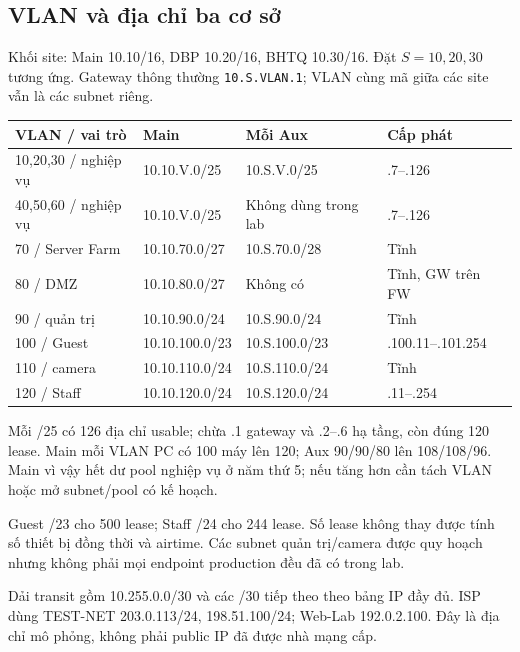 \documentclass[
  11pt,
]{article}
\begin{document}
\subsection{VLAN và địa chỉ ba cơ sở}
Khối site: Main 10.10/16, DBP 10.20/16, BHTQ 10.30/16. Đặt $S=10,20,30$ tương ứng. Gateway thông thường \texttt{10.S.VLAN.1}; VLAN cùng mã giữa các site vẫn là các subnet riêng.
\par\noindent
{}
\begin{tabularx}{\linewidth}{@{}lXXX@{}}\toprule
VLAN / vai trò & Main & Mỗi Aux & Cấp phát\\\midrule
10,20,30 / nghiệp vụ & 10.10.V.0/25 & 10.S.V.0/25 & .7--.126\\
40,50,60 / nghiệp vụ & 10.10.V.0/25 & Không dùng trong lab & .7--.126\\
70 / Server Farm & 10.10.70.0/27 & 10.S.70.0/28 & Tĩnh\\
80 / DMZ & 10.10.80.0/27 & Không có & Tĩnh, GW trên FW\\
90 / quản trị & 10.10.90.0/24 & 10.S.90.0/24 & Tĩnh\\
100 / Guest & 10.10.100.0/23 & 10.S.100.0/23 & .100.11--.101.254\\
110 / camera & 10.10.110.0/24 & 10.S.110.0/24 & Tĩnh\\
120 / Staff & 10.10.120.0/24 & 10.S.120.0/24 & .11--.254\\\bottomrule\end{tabularx}\par

Mỗi /25 có 126 địa chỉ usable; chừa .1 gateway và .2--.6 hạ tầng, còn đúng 120 lease. Main mỗi VLAN PC có 100 máy lên 120; Aux 90/90/80 lên 108/108/96. Main vì vậy hết dư pool nghiệp vụ ở năm thứ 5; nếu tăng hơn cần tách VLAN hoặc mở subnet/pool có kế hoạch.

Guest /23 cho 500 lease; Staff /24 cho 244 lease. Số lease không thay được tính số thiết bị đồng thời và airtime. Các subnet quản trị/camera được quy hoạch nhưng không phải mọi endpoint production đều đã có trong lab.

Dải transit gồm 10.255.0.0/30 và các /30 tiếp theo theo bảng IP đầy đủ. ISP dùng TEST-NET 203.0.113/24, 198.51.100/24; Web-Lab 192.0.2.100. Đây là địa chỉ mô phỏng, không phải public IP đã được nhà mạng cấp.

\clearpage
\end{document}
